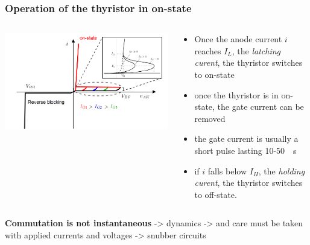 \begin{frame}
\frametitle{Operation of the thyristor in on-state}

\begin{columns}
\begin{column}{0.4\linewidth}
\begin{center}
    \includegraphics[width=\linewidth]{images/thyristor4.png}
\end{center}
\end{column}
\begin{column}{0.6\linewidth}
\begin{itemize}
    \item Once the anode current $i$ reaches $I_L$, the \textit{latching curent}, the thyristor switches to on-state
    \item once the thyristor is in on-state, the gate current can be removed
    \item the gate current is usually a short pulse lasting \SI{10}{}-\SI{50}{\mu s}
    \item if $i$ falls below $I_H$, the \textit{holding curent}, the thyristor switches to off-state.
\end{itemize}
\end{column}
\end{columns}
\textbf{Commutation is not instantaneous} -> dynamics -> and care must be taken with applied currents and voltages -> snubber circuits
\end{frame}

